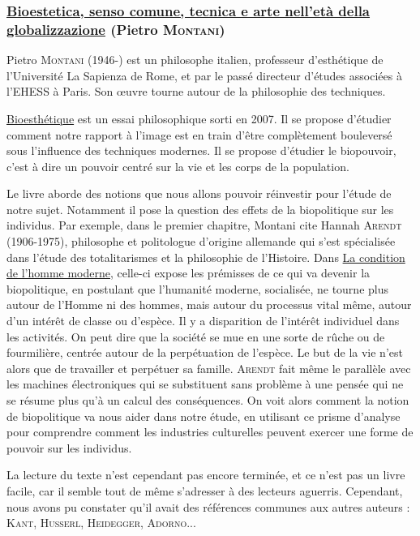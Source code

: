 \documentclass[a4paper,10pt]{article}
\begin{document}
\subsubsection{\underline{Bioestetica, senso comune, tecnica e arte nell'età della globalizzazione} (Pietro \textsc{Montani})}

Pietro \textsc{Montani} (1946-) est un philosophe italien, professeur d'esthétique de l'Université La Sapienza de Rome, et par le passé directeur d'études associées à l'EHESS à Paris. Son \oe{}uvre tourne autour de la philosophie des techniques.

\underline{Bioesthétique} est un essai philosophique sorti en 2007. Il se propose d'étudier comment notre rapport à l'image est en train d'être complètement bouleversé sous l'influence des techniques modernes. Il se propose d'étudier le biopouvoir, c'est à dire un pouvoir centré sur la vie et les corps de la population.

Le livre aborde des notions que nous allons pouvoir réinvestir pour l'étude de notre sujet. Notamment il pose la question des effets de la biopolitique sur les individus. Par exemple, dans le premier chapitre, Montani cite Hannah \textsc{Arendt} (1906-1975), philosophe et politologue d'origine allemande qui s'est spécialisée dans l'étude des totalitarismes et la philosophie de l'Histoire. Dans \underline{La condition de l'homme moderne}, celle-ci expose les prémisses de ce qui va devenir la biopolitique, en postulant que l'humanité moderne, socialisée, ne tourne plus autour de l'Homme ni des hommes, mais autour du processus vital même, autour d'un intérêt de classe ou d'espèce. Il y a disparition de l'intérêt individuel dans les activités. On peut dire que la société se mue en une sorte de rûche ou de fourmilière, centrée autour de la perpétuation de l'espèce. Le but de la vie n'est alors que de travailler et perpétuer sa famille. \textsc{Arendt} fait même le parallèle avec les machines électroniques qui se substituent sans problème à une pensée qui ne se résume plus qu'à un calcul des conséquences. On voit alors comment  la notion de biopolitique va nous aider dans notre étude, en utilisant ce prisme d'analyse pour comprendre comment les industries culturelles peuvent exercer une forme de pouvoir sur les individus.

La lecture du texte n'est cependant pas encore terminée, et ce n'est pas un livre facile, car il semble tout de même s'adresser à des lecteurs aguerris. Cependant, nous avons pu constater qu'il avait des références communes aux autres auteurs : \textsc{Kant}, \textsc{Husserl}, \textsc{Heidegger}, \textsc{Adorno}...
\end{document}
